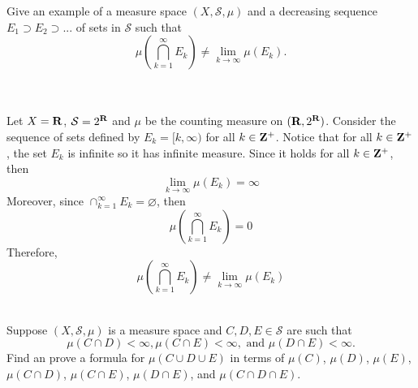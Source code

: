 \begin{exercise}
    Give an example of a measure space $(X, \mathcal{S}, \mu)$ and a decreasing sequence $E_1 \supset E_2 \supset ... $ of sets in $\mathcal{S}$ such that
    $$\mu\left(\bigcap_{k=1}^{\infty}E_k\right) \neq \lim_{k \rightarrow \infty} \mu(E_k).$$\\
\end{exercise}

\begin{solution}
    \\ Let $X = \mathbf{R}$, $\mathcal{S} = 2^{\mathbf{R}}$ and $\mu$ be the counting measure on $(\mathbf{R}, 2^{\mathbf{R}})$. Consider the sequence of sets defined by $E_k = [k, \infty)$ for all $k \in \mathbf{Z}^+$. Notice that for all $k \in \mathbf{Z}^+$, the set $E_k$ is infinite so it has infinite measure. Since it holds for all $k \in \mathbf{Z}^+$, then
    $$\lim_{k \rightarrow \infty} \mu(E_k) = \infty$$
    Moreover, since $\cap_{k=1}^{\infty}E_k = \varnothing$, then
    $$\mu\left(\bigcap_{k=1}^{\infty}E_k\right) = 0$$
    Therefore,
    $$\mu\left(\bigcap_{k=1}^{\infty}E_k\right) \neq \lim_{k \rightarrow \infty} \mu(E_k)$$\\
\end{solution}

\begin{exercise}
    Suppose $(X, \mathcal{S}, \mu)$ is a measure space and $C, D, E \in \mathcal{S}$ are such that
    $$\mu(C \cap D) < \infty, \mu(C \cap E) < \infty, \text{ and }\mu(D \cap E) < \infty.$$
    Find an prove a formula for $\mu(C \cup D \cup E)$ in terms of $\mu(C)$, $\mu(D)$, $\mu(E)$, $\mu(C \cap D)$, $\mu(C\cap E)$, $\mu(D \cap E)$, and $\mu(C \cap D \cap E)$. \\
\end{exercise}

